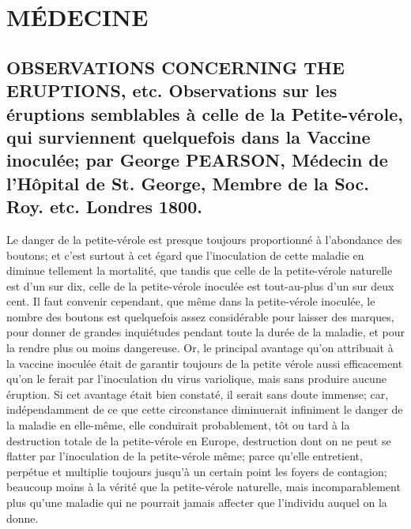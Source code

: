 \setcounter{page}{254}
\chapter{MÉDECINE}
\section{OBSERVATIONS CONCERNING THE ERUPTIONS, etc. Observations sur les éruptions semblables à celle de la Petite-vérole, qui surviennent quelquefois dans la Vaccine inoculée; par George PEARSON, Médecin de l'Hôpital de St. George, Membre de la Soc. Roy. etc. Londres 1800.}
Le danger de la petite-vérole est presque toujours proportionné à l'abondance des boutons; et c'est surtout à cet égard que l'inoculation de cette maladie en diminue tellement la mortalité, que tandis que celle de la petite-vérole naturelle est d'un sur dix, celle de la petite-vérole inoculée est tout-au-plus d'un sur deux cent. Il faut convenir cependant, que même dans la petite-vérole inoculée, le nombre des boutons est quelquefois\setcounter{page}{255} assez considérable pour laisser des marques, pour donner de grandes inquiétudes pendant toute la durée de la maladie, et pour la rendre plus ou moins dangereuse.
Or, le principal avantage qu'on attribuait à la vaccine inoculée était de garantir toujours de la petite vérole aussi efficacement qu'on le ferait par l'inoculation du virus variolique, mais sans produire aucune éruption. Si cet avantage était bien constaté, il serait sans doute immense; car, indépendamment de ce que cette circonstance diminuerait infiniment le danger de la maladie en elle-même, elle conduirait probablement, tôt ou tard à la destruction totale de la petite-vérole en Europe, destruction dont on ne peut se flatter par l'inoculation de la petite-vérole même; parce qu'elle entretient, perpétue et multiplie toujours jusqu'à un certain point les foyers de contagion; beaucoup moins à la vérité que la petite-vérole naturelle, mais incomparablement plus qu'une maladie qui ne pourrait jamais affecter que l'individu auquel on la donne.

